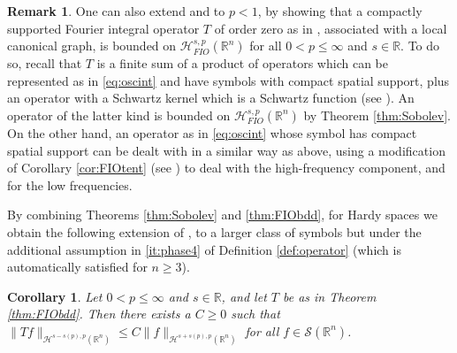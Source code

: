 \documentclass{amsart}
\newcommand {\veps}{\varepsilon}
\newcommand {\HT}{\mathcal{H}}
\newcommand {\Hps}{\mathcal{H}^{s,p}_{FIO}(\Rn)}
\newcommand {\R}{\mathbb R}
\newcommand {\Rn}{\mathbb{R}^{n}}
\newcommand {\Sw}{\mathcal{S}}
\newtheorem{corollary}[theorem]{Corollary}
\theoremstyle{definition}
\newtheorem{remark}[theorem]{Remark}
\numberwithin{equation}{section}
\begin{document}
\begin{remark}\label{rem:FIOlocalbdd}
One can also extend \cite[Theorem 3.7]{Smith98a} and \cite[Proposition 2.3]{LiRoSoYa24} to $p<1$, by showing that a compactly supported Fourier integral operator $T$ of order zero as in \cite[Section 25.2]{Hormander09}, associated with a local canonical graph, is bounded on $\Hps$ for all $0<p\leq\infty$ and $s\in\R$. To do so, recall that $T$ is a finite sum of a product of operators which can be represented as in \eqref{eq:oscint} and have symbols with compact spatial support, plus an operator with a Schwartz kernel which is a Schwartz function (see \cite[Proposition 2.14]{HaPoRo20}). An operator of the latter kind is bounded on $\Hps$ by Theorem \ref{thm:Sobolev}. On the other hand, an operator as in \eqref{eq:oscint} whose symbol has compact spatial support can be dealt with in a similar way as above, using a modification of Corollary \ref{cor:FIOtent} (see \cite[Corollary 5.4]{HaPoRo20}) to deal with the high-frequency component, and \cite[Theorem 6.5]{IsRoSt21} for the low frequencies. 
\end{remark}

By combining Theorems \ref{thm:Sobolev} and \ref{thm:FIObdd}, for Hardy spaces we obtain the following extension of \cite[Theorem 6.1]{IsRoSt21}, to a larger class of symbols but under the additional assumption in \eqref{it:phase4} of Definition \ref{def:operator} (which is automatically satisfied for $n\geq3$).

\begin{corollary}\label{cor:FIObdd}
Let $0<p\leq\infty$ and $s\in\R$, and let $T$ be as in Theorem \ref{thm:FIObdd}. Then there exists a $C\geq0$ such that $\|Tf\|_{\HT^{s-s(p),p}(\Rn)}\leq C\|f\|_{\HT^{s+s(p),p}(\Rn)}$ for all $f\in\Sw(\Rn)$.
\end{corollary}





\end{document}
